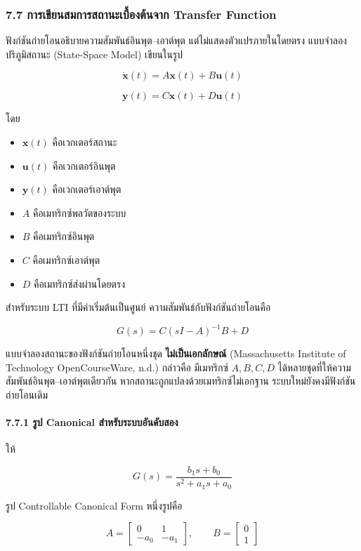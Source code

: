 \subsubsection{7.7 การเขียนสมการสถานะเบื้องต้นจาก Transfer Function}

ฟังก์ชันถ่ายโอนอธิบายความสัมพันธ์อินพุต–เอาต์พุต แต่ไม่แสดงตัวแปรภายในโดยตรง แบบจำลองปริภูมิสถานะ (State-Space Model) เขียนในรูป

\[
\dot{\mathbf{x}}(t)=A\mathbf{x}(t)+B\mathbf{u}(t)
\]

\[
\mathbf{y}(t)=C\mathbf{x}(t)+D\mathbf{u}(t)
\]

โดย

\begin{itemize}
    \item $\mathbf{x}(t)$ คือเวกเตอร์สถานะ
    \item $\mathbf{u}(t)$ คือเวกเตอร์อินพุต
    \item $\mathbf{y}(t)$ คือเวกเตอร์เอาต์พุต
    \item $A$ คือเมทริกซ์พลวัตของระบบ
    \item $B$ คือเมทริกซ์อินพุต
    \item $C$ คือเมทริกซ์เอาต์พุต
    \item $D$ คือเมทริกซ์ส่งผ่านโดยตรง
\end{itemize}

สำหรับระบบ LTI ที่มีค่าเริ่มต้นเป็นศูนย์ ความสัมพันธ์กับฟังก์ชันถ่ายโอนคือ

\[
\boxed{
G(s)=C(sI-A)^{-1}B+D
}
\]

แบบจำลองสถานะของฟังก์ชันถ่ายโอนหนึ่งชุด \textbf{ไม่เป็นเอกลักษณ์} (Massachusetts Institute of Technology OpenCourseWare, n.d.) กล่าวคือ มีเมทริกซ์ $A,B,C,D$ ได้หลายชุดที่ให้ความสัมพันธ์อินพุต–เอาต์พุตเดียวกัน หากสถานะถูกแปลงด้วยเมทริกซ์ไม่เอกฐาน ระบบใหม่ยังคงมีฟังก์ชันถ่ายโอนเดิม

\paragraph{7.7.1 รูป Canonical สำหรับระบบอันดับสอง}

ให้

\[
G(s)=\frac{b_1s+b_0}{s^2+a_1s+a_0}
\]

รูป Controllable Canonical Form หนึ่งรูปคือ

\[
A=
\begin{bmatrix}
0 & 1\\
-a_0 & -a_1
\end{bmatrix},
\qquad
B=
\begin{bmatrix}
0\\
1
\end{bmatrix}
\]

